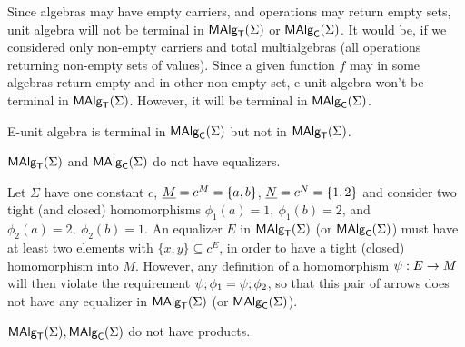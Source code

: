 \documentclass[10pt]{article}
\begin{document}
\noindent  
Since algebras may have empty carriers, and operations may return
empty sets, unit algebra will not be terminal in $\mbox{\rm\sf MAlg}_{\sf T}(\Sigma)$ or
$\mbox{\rm\sf MAlg}_{\sf C}(\Sigma)$. It would be, if we considered only non-empty carriers and
total multialgebras (all operations returning non-empty sets of
values). Since a given function $f$ may in some algebras return empty
and in other non-empty set, e-unit algebra won't be terminal in
$\mbox{\rm\sf MAlg}_{\sf T}(\Sigma)$.  However, it will be terminal in $\mbox{\rm\sf MAlg}_{\sf C}(\Sigma)$.

\begin{Fact}
E-unit algebra is terminal in $\mbox{\rm\sf MAlg}_{\sf C}(\Sigma)$ but not in  $\mbox{\rm\sf MAlg}_{\sf T}(\Sigma)$.
\end{Fact}


\begin{Fact}
$\mbox{\rm\sf MAlg}_{\sf T}(\Sigma)$ and $\mbox{\rm\sf MAlg}_{\sf C}(\Sigma)$ do not have equalizers.
\end{Fact}

\begin{Proof}
Let $\Sigma$ have one constant $c$, $\underline {M}=c^M=\{a,b\}$, $\underline {N}=c^N=\{1,2\}$ and consider two tight (and closed) homomorphisms
$\phi_1(a)=1,\ \phi_1(b)=2$, and $\phi_2(a)=2,\ \phi_2(b)=1$. An
equalizer $E$ in $\mbox{\rm\sf MAlg}_{\sf T}(\Sigma)$ (or $\mbox{\rm\sf MAlg}_{\sf C}(\Sigma)$) must have at least two elements
with $\{x,y\}\subseteq c^E$, in order to have a tight (closed)
homomorphism into $M$. However, any definition of a homomorphism
$\psi:E\rightarrow M$ will then violate the requirement
$\psi;\phi_1=\psi;\phi_2$, so that this pair of arrows
does not have any equalizer in $\mbox{\rm\sf MAlg}_{\sf T}(\Sigma)$ (or $\mbox{\rm\sf MAlg}_{\sf C}(\Sigma)$).
\end{Proof}

\begin{Fact}\label{le:noprod}
$\mbox{\rm\sf MAlg}_{\sf T}(\Sigma), \mbox{\rm\sf MAlg}_{\sf C}(\Sigma)$ do not have products.
\end{Fact}
\end{document}
